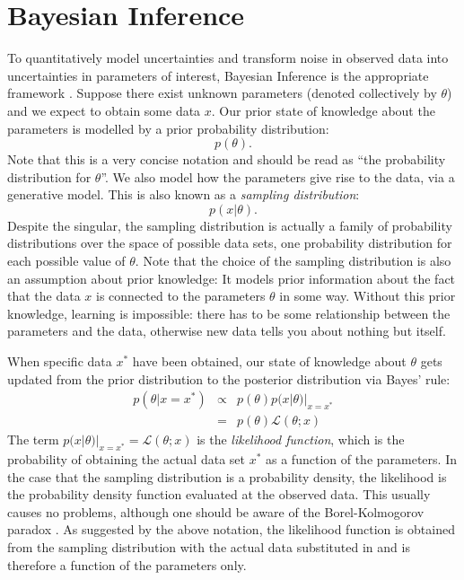 \documentclass[12pt, preprint]{aastex}
\begin{document}
\section{Bayesian Inference}
To quantitatively model uncertainties and transform noise in observed data
into uncertainties in parameters of interest, Bayesian Inference is the appropriate
framework \citep{cox, jaynes, caticha, mackay}. Suppose there exist unknown parameters
(denoted
collectively by $\theta$) and we expect to obtain some data $x$. Our prior
state of knowledge about the parameters is modelled by a prior
probability distribution:
\begin{equation}
p(\theta).
\end{equation}
Note that this is a very concise notation \citep{hogg} and should be read
as ``the probability distribution for $\theta$''.
We also model how the parameters give rise to the data, via a generative model.
This is also known as a {\it sampling distribution}:
\begin{equation}
p(x|\theta).
\end{equation}
Despite the singular, the sampling distribution is actually a family of
probability distributions over the space of possible data sets, one probability
distribution for each possible value
of $\theta$. Note that the choice of
the sampling distribution is also an assumption about prior knowledge:
It models prior information about the fact that the data $x$ is connected to
the parameters $\theta$ in some way. Without this prior knowledge, learning is
impossible: there has to be some relationship between the parameters and the
data, otherwise new data tells you about nothing but itself.

When specific data $x^*$ have been obtained, our state of knowledge about $\theta$
gets updated from the prior distribution to the posterior distribution
via Bayes' rule:
\begin{eqnarray}
p(\theta|x=x^*) &\propto& p(\theta)p(x|\theta)|_{x=x^*} \\
&=& p(\theta)\mathcal{L}(\theta; x)
\end{eqnarray}
The term $p(x|\theta)|_{x=x^*} = \mathcal{L}(\theta; x)$
is the {\it likelihood function}, which is the
probability of obtaining the actual data set $x^*$ as a function of the
parameters. In the case that the sampling distribution is a probability
density, the likelihood is the probability density function evaluated at the observed
data. This usually causes no problems, although one should be aware of the
Borel-Kolmogorov paradox \citep{jaynes}.
As suggested by the above notation, the likelihood function is obtained from the
sampling distribution with the actual data substituted in and is therefore
a function of the parameters only.
\end{document}
